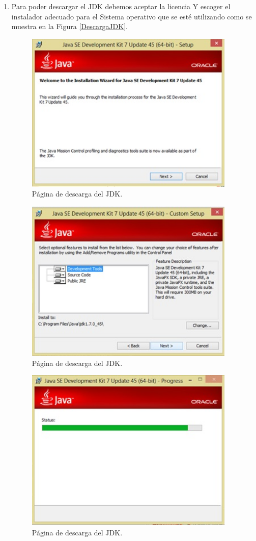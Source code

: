 \documentclass[12pt]{book} %
\begin{document}
\begin{enumerate}
\item Para poder descargar el JDK debemos aceptar la licencia Y escoger el instalador adecuado para el Sistema operativo que se esté utilizando como se muestra en la Figura \ref{DescargaJDK}.

	\begin{figure}[!hbp]
		\centering
			\includegraphics[width=10cm]{ins3.jpg}
			\caption{Página de descarga del JDK.}
			\label{ini}
	\end{figure}
	\begin{figure}[!hbp]
		\centering
			\includegraphics[width=10cm]{ins4.jpg}
			\caption{Página de descarga del JDK.}
		
	\end{figure}
	\begin{figure}[!hbp]
		\centering
			\includegraphics[width=10cm]{ins5.jpg}
			\caption{Página de descarga del JDK.}
		

\end{figure}
\end{enumerate}
\end{document}
